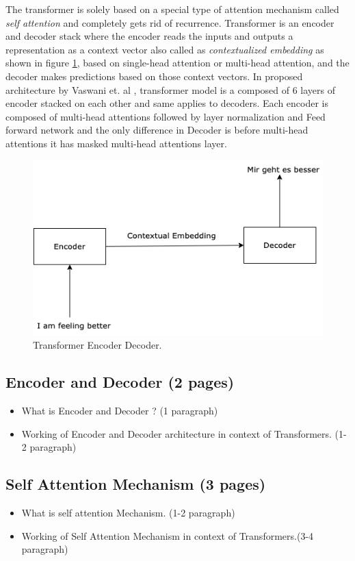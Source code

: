 \documentclass[%
	BCOR=8mm, %
	DIV=12, 
	toc=bibliography, %
	toc=listof, %
	oneside, %
	egregdoesnotlikesansseriftitles, %
	]{scrbook}
\begin{document}
The transformer is solely based on a special type of attention mechanism called \textit{self attention} and completely gets rid of recurrence. Transformer is an encoder and decoder stack  where the encoder reads the inputs and outputs a representation as a context vector also called as \textit{contextualized embedding} as shown in figure \ref{diag:EncoderDecoder}, based on single-head attention or multi-head attention, and the decoder makes predictions based on those context vectors. In proposed architecture by Vaswani et. al \cite{vaswani_attention_2017}, transformer model is a composed of 6 layers of encoder stacked on each other and same applies to decoders.  Each encoder is composed of multi-head attentions followed by layer normalization and Feed forward network and the only difference in Decoder is before multi-head attentions it has masked multi-head attentions layer. 
\begin{figure}[h!]
\centering
\includegraphics[width=.50\textwidth]{img/encoderDecoder.png}
\caption[Encoder Decoder]{Transformer Encoder Decoder.}
\label{diag:EncoderDecoder}
\end{figure}

\subsection{Encoder and Decoder (2 pages)}
\begin{itemize}
\item  What is Encoder and Decoder ?  (1 paragraph)
\item Working of Encoder and Decoder architecture in context of Transformers. (1-2 paragraph)
\end{itemize}

\subsection{Self Attention Mechanism (3 pages)}
\begin{itemize}
\item What is self attention Mechanism. (1-2 paragraph)
\item Working of Self Attention Mechanism in context of Transformers.(3-4 paragraph)
\end{itemize}
\end{document}
